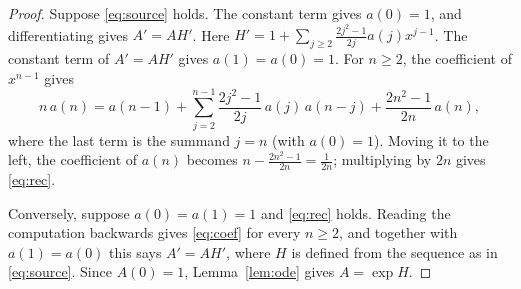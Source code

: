 \documentclass[11pt,a4paper]{article}
\theoremstyle{definition}
\theoremstyle{remark}
\begin{document}
\begin{proof}
Suppose \eqref{eq:source} holds. The constant term gives $a(0)=1$, and differentiating gives $A'=AH'$. Here
$H'=1+\sum_{j\ge2}\frac{2j^2-1}{2j}a(j)x^{j-1}$. The constant term of $A'=AH'$ gives $a(1)=a(0)=1$. For $n\ge2$, the
coefficient of $x^{n-1}$ gives
\begin{equation}\label{eq:coef}
n\,a(n)=a(n-1)+\sum_{j=2}^{n-1}\frac{2j^2-1}{2j}\,a(j)\,a(n-j)+\frac{2n^2-1}{2n}\,a(n),
\end{equation}
where the last term is the summand $j=n$ (with $a(0)=1$). Moving it to the left, the coefficient of $a(n)$ becomes
$n-\frac{2n^2-1}{2n}=\frac1{2n}$; multiplying by $2n$ gives \eqref{eq:rec}.

Conversely, suppose $a(0)=a(1)=1$ and \eqref{eq:rec} holds. Reading the computation backwards gives \eqref{eq:coef} for
every $n\ge2$, and together with $a(1)=a(0)$ this says $A'=AH'$, where $H$ is defined from the sequence as in
\eqref{eq:source}. Since $A(0)=1$, Lemma~\ref{lem:ode} gives $A=\exp H$.
\end{proof}
\end{document}
